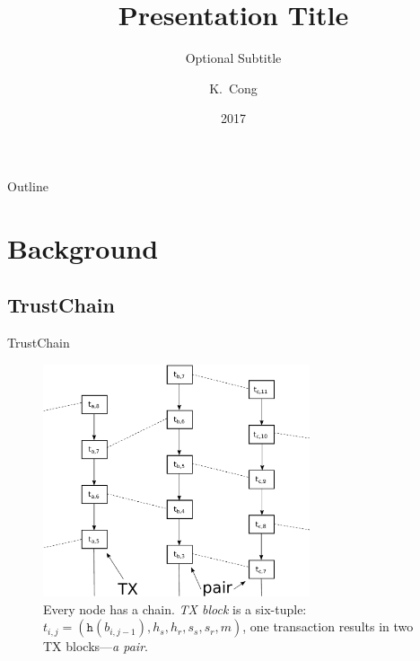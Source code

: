\documentclass{beamer}
\title{Presentation Title}
\subtitle{Optional Subtitle}
\author{K.~Cong}
\institute[Delft University of Technology] %
{
  Faculty of Electrical Engineering, Mathematics and Computer Science\\
  Delft University of Technology}
\date{2017}
\begin{document}
\begin{frame}
  \titlepage
\end{frame}

\begin{frame}{Outline}
  \tableofcontents
\end{frame}

\section{Background}

\subsection{TrustChain}

\begin{frame}{TrustChain}{}

  \begin{figure}[h]
  \includegraphics[width=0.7\textwidth]{trustchain-good}
  \centering
  \caption{Every node has a chain. \emph{TX block} is a six-tuple: $t_{i,j} =
    (\texttt{h}(b_{i,j-1}), h_s, h_r, s_s, s_r, m)$, one transaction results in
    two TX blocks---\emph{a pair}.}
  \end{figure}

\end{frame}
\end{document}
